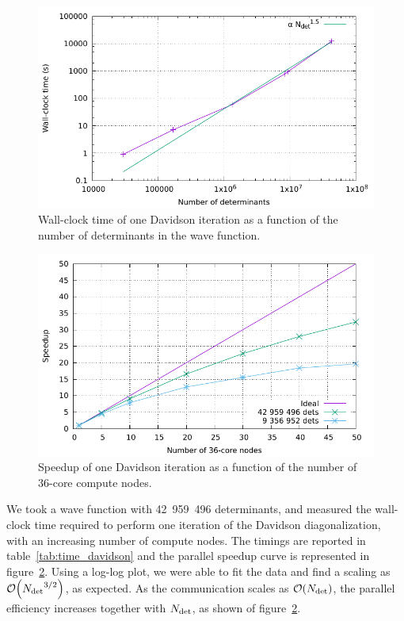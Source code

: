 \documentclass[./thesis.tex]{subfiles}
\begin{document}
\begin{figure}[h]
    \begin{center}
      \includegraphics[width=0.8\columnwidth]{figures/perf/scaling_davidson_ndet}
      \caption{Wall-clock time of one Davidson iteration as a function of the number of
determinants in the wave function.}
      \label{fig:speedup_davidson_ndet}
    \end{center}
\end{figure}

\begin{figure}[h]
    \begin{center}
      \includegraphics[width=0.8\columnwidth]{figures/perf/scaling_davidson}
      \caption{Speedup of one Davidson iteration as a function of the number of
36-core compute nodes.}
      \label{fig:speedup_davidson}
    \end{center}
\end{figure}

We took a wave function with 42~959~496 determinants, and measured the wall-clock time required to
perform one iteration of the Davidson diagonalization, with an increasing number of compute nodes.
The timings are reported in table~\ref{tab:time_davidson} and the parallel speedup curve is represented in figure~\ref{fig:speedup_davidson}. Using a log-log plot, we were able to fit the data and find
a scaling as $\order{\Ndet^{3/2}}$, as expected.  As the communication scales as $\order{\Ndet}$, 
the parallel efficiency increases together with ${N_\text{det}}$, as shown of figure~\ref{fig:speedup_davidson}.
\end{document}
